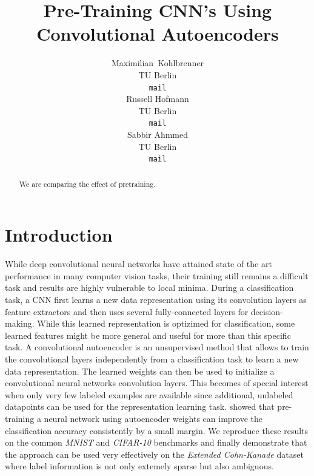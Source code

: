 \documentclass{article}
\title{Pre-Training CNN's Using Convolutional Autoencoders}
\author{
  Maximilian~Kohlbrenner\\
  TU Berlin\\
  \texttt{mail} \\
  \And
  Russell Hofmann\\
  TU Berlin\\
  \texttt{mail} \\
  \AND
  Sabbir Ahmmed \\
  TU Berlin \\
  \texttt{mail}
}
\begin{document}

\maketitle

\begin{abstract}
  We are comparing the effect of pretraining.
\end{abstract}

\section{Introduction}
  While deep convolutional neural networks have attained state of the art performance in many computer vision tasks, their training still remains a difficult task and results are highly vulnerable to local minima. 
  During a classification task, a CNN first learns a new data representation using its convolution layers as feature extractors and then uses several fully-connected layers for decision-making. 
  While this learned representation is optizimed for classification, some learned features might be more general and useful for more than this specific task. 
  A convolutional autoencoder is an unsupervised method that allows to train the convolutional layers independently from a classification task to learn a new data representation. The learned weights can then be used to initialize a convolutional neural networks convolution layers. 
  This becomes of special interest when only very few labeled examples are available since additional, unlabeled datapoints can be used for the representation learning task. 
  \citep{masci2011stacked} showed that pre-training a neural network using autoencoder weights can improve the classification accuracy consistently by a small margin.
  We reproduce these results on the common \emph{MNIST} and \emph{CIFAR-10} benchmarks and finally demonstrate that the approach can be used very effectively on the \emph{Extended Cohn-Kanade} dataset where label information is not only extemely sparse but also ambiguous. 
\end{document}
